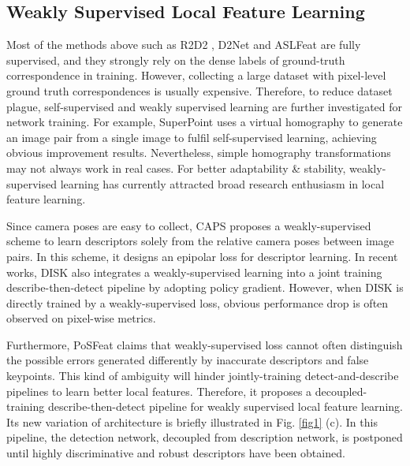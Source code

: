 \documentclass[journal]{IEEEtran}
\begin{document}
\subsection{Weakly Supervised Local Feature Learning}\label{relatedworksB}
Most of the methods above such as R2D2 \cite{R2D2}, D2Net \cite{D2net} and ASLFeat \cite{aslfeat} are fully supervised, and they strongly rely on the dense labels of ground-truth correspondence in training. However, collecting a large dataset with pixel-level ground truth correspondences is usually expensive. Therefore, to reduce dataset plague, self-supervised and weakly supervised learning are further investigated for network training. For example, SuperPoint \cite{SuperPoint} uses a virtual homography to generate an image pair from a single image to fulfil self-supervised learning, achieving obvious improvement results. Nevertheless, simple homography transformations may not always work in real cases. For better adaptability \& stability, weakly-supervised learning has currently attracted broad research enthusiasm in local feature learning.

Since camera poses are easy to collect, CAPS \cite{caps} proposes a weakly-supervised scheme to learn descriptors solely from the relative camera poses between image pairs. In this scheme, it designs an epipolar loss for descriptor learning. In recent works, DISK \cite{disk} also integrates a weakly-supervised learning into a joint training describe-then-detect pipeline by adopting policy gradient. However, when DISK is directly trained by a weakly-supervised loss, obvious performance drop is often observed on pixel-wise metrics. 

Furthermore, PoSFeat \cite{li2022decoupling} claims that weakly-supervised loss cannot often distinguish the possible errors generated differently by inaccurate descriptors and false keypoints. This kind of ambiguity will hinder jointly-training detect-and-describe pipelines to learn better local features. Therefore, it proposes a decoupled-training describe-then-detect pipeline for weakly supervised local feature learning. Its new variation of architecture is briefly illustrated in Fig. \ref{fig1} (c). In this pipeline, the detection network, decoupled from description network, is postponed until highly discriminative and robust descriptors have been obtained. 
\end{document}
